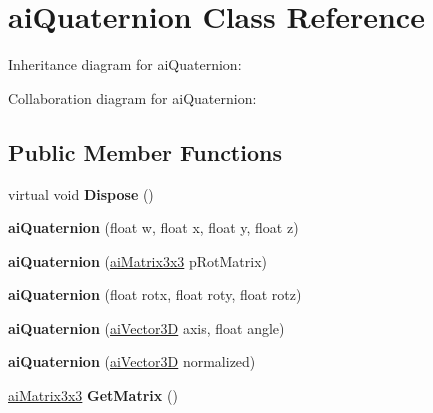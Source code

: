 \hypertarget{structai_quaternion}{\section{ai\+Quaternion Class Reference}
\label{structai_quaternion}
}


Inheritance diagram for ai\+Quaternion\+:


Collaboration diagram for ai\+Quaternion\+:
\subsection*{Public Member Functions}
\begin{DoxyCompactItemize}
\item 
\hypertarget{structai_quaternion_a9c4f6dee2ad52a5ce32ff405b5583f07}{virtual void {\bfseries Dispose} ()}\label{structai_quaternion_a9c4f6dee2ad52a5ce32ff405b5583f07}

\item 
\hypertarget{structai_quaternion_a6574423222b27eb00950b2f8b2d75772}{{\bfseries ai\+Quaternion} (float w, float x, float y, float z)}\label{structai_quaternion_a6574423222b27eb00950b2f8b2d75772}

\item 
\hypertarget{structai_quaternion_ae10b6dc5613b15c35bdacd2b88bf560f}{{\bfseries ai\+Quaternion} (\hyperlink{structai_matrix3x3}{ai\+Matrix3x3} p\+Rot\+Matrix)}\label{structai_quaternion_ae10b6dc5613b15c35bdacd2b88bf560f}

\item 
\hypertarget{structai_quaternion_a4bac8acd700fe58dcc2fa715b4408473}{{\bfseries ai\+Quaternion} (float rotx, float roty, float rotz)}\label{structai_quaternion_a4bac8acd700fe58dcc2fa715b4408473}

\item 
\hypertarget{structai_quaternion_a3fcc68eda8fe25e966df6b3a650ca9b5}{{\bfseries ai\+Quaternion} (\hyperlink{structai_vector3_d}{ai\+Vector3\+D} axis, float angle)}\label{structai_quaternion_a3fcc68eda8fe25e966df6b3a650ca9b5}

\item 
\hypertarget{structai_quaternion_af72a2bcc8c9432ee6632c2b7857144bf}{{\bfseries ai\+Quaternion} (\hyperlink{structai_vector3_d}{ai\+Vector3\+D} normalized)}\label{structai_quaternion_af72a2bcc8c9432ee6632c2b7857144bf}

\item 
\hypertarget{structai_quaternion_a0dab128d39c463ef66a0c1bc6d1b99bf}{\hyperlink{structai_matrix3x3}{ai\+Matrix3x3} {\bfseries Get\+Matrix} ()}\label{structai_quaternion_a0dab128d39c463ef66a0c1bc6d1b99bf}


\end{DoxyCompactItemize}

